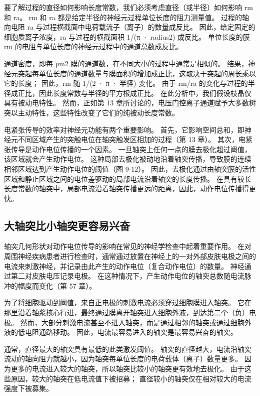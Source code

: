 要了解过程的直径如何影响长度常数，我们必须考虑直径（或半径）如何影响 rm 和 ra。 rm 和 ra 都是给定半径的神经元过程单位长度的阻力测量值。 过程的轴向电阻 ra 与过程横截面中电荷载流子（离子）的数量成反比。 因此，给定固定的细胞质离子浓度，ra 与过程的横截面积 1/(π · radius2) 成反比。 单位长度的膜 rm 的电阻与单位长度的神经元过程中的通道总数成反比。

通道密度，即每 μm2 膜的通道数，在不同大小的过程中通常是相似的。 结果，神经元突起每单位长度的通道数量与膜面积的增加成正比，这取决于突起的周长乘以它的长度； 因此，rm 随 1/(2 · π · 半径) 变化。 由于 rm/ra 的变化与过程的半径成正比，因此长度常数与半径的平方根成正比。 在此分析中，我们假设枝晶仅具有被动电特性。 然而，正如第 13 章所讨论的，电压门控离子通道赋予大多数树突以主动特性，这些特性改变了它们的纯被动长度常数。

电紧张传导的效率对神经元功能有两个重要影响。 首先，它影响空间总和，即神经元不同区域产生的突触电位在轴突触发区相加的过程（第 13 章）。 其次，电紧张传导是动作电位传播的一个因素。 一旦轴突上任何一点的膜去极化超过阈值，该区域就会产生动作电位。 这种局部去极化被动地沿着轴突传播，导致膜的连续相邻区域达到产生动作电位的阈值（图 9-12）。 因此，去极化通过由轴突膜的活性区域和静止区域之间的电位差驱动的局部电流沿着轴突的长度传播。 在具有较长长度常数的轴突中，局部电流沿着轴突传播更远的距离，因此，动作电位传播得更快。


\subsection{大轴突比小轴突更容易兴奋}

轴突几何形状对动作电位传导的影响在常见的神经学检查中起着重要作用。 在对周围神经疾病患者进行检查时，通常通过放置在神经上的一对外部皮肤电极之间的电流来刺激神经，并记录由此产生的动作电位（复合动作电位）的数量。 神经通过第二对皮肤电压记录电极。 在这种情况下，产生动作电位的轴突总数随电流脉冲的幅度而变化（第 57 章）。

为了将细胞驱动到阈值，来自正电极的刺激电流必须穿过细胞膜进入轴突。 它在那里沿着轴浆核心行进，最终通过膜离开轴突进入细胞外液，到达第二个（负）电极。 然而，大部分刺激电流甚至不进入轴突，而是通过相邻的轴突或通过细胞外液的低电阻通路移动。 因此，电流最容易进入的轴突是最容易兴奋的轴突。

通常，直径最大的轴突具有最低的此类激发阈值。 轴突的直径越大，电流沿轴突流动的轴向阻力就越小，因为轴突每单位长度的电荷载体（离子）数量更多。 因为更多的电流进入较大的轴突，所以轴突比较小的轴突更有效地去极化。 由于这些原因，较大的轴突在低电流值下被招募； 直径较小的轴突仅在相对较大的电流强度下被募集。

